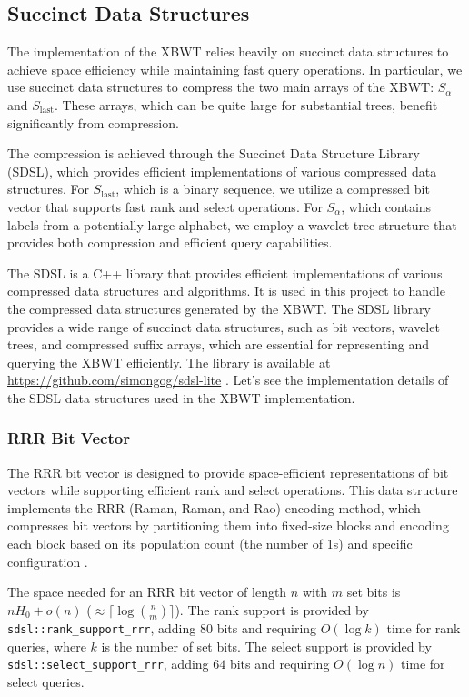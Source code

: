 \subsection{Succinct Data Structures}
The implementation of the XBWT relies heavily on succinct data structures to achieve space efficiency while maintaining fast query operations. In particular, we use succinct data structures to compress the two main arrays of the XBWT: $S_\alpha$ and $S_{\text{last}}$. These arrays, which can be quite large for substantial trees, benefit significantly from compression.

The compression is achieved through the Succinct Data Structure Library (SDSL), which provides efficient implementations of various compressed data structures. For $S_{\text{last}}$, which is a binary sequence, we utilize a compressed bit vector that supports fast rank and select operations. For $S_\alpha$, which contains labels from a potentially large alphabet, we employ a wavelet tree structure that provides both compression and efficient query capabilities.

The SDSL is a C++ library that provides efficient implementations of various compressed data structures and algorithms. It is used in this project to handle the compressed data structures generated by the XBWT. The SDSL library provides a wide range of succinct data structures, such as bit vectors, wavelet trees, and compressed suffix arrays, which are essential for representing and querying the XBWT efficiently. The library is available at \url{https://github.com/simongog/sdsl-lite} \cite{gbmp2014sea}. Let's see the implementation details of the SDSL data structures used in the XBWT implementation.

\subsubsection{RRR Bit Vector}
The RRR bit vector is designed to provide space-efficient representations of bit vectors while supporting efficient rank and select operations. This data structure implements the RRR (Raman, Raman, and Rao) encoding method, which compresses bit vectors by partitioning them into fixed-size blocks and encoding each block based on its population count (the number of 1s) and specific configuration \cite{raman2002succinct}. 

The space needed for an RRR bit vector of length $n$ with $m$ set bits is $nH_0 + o(n)$ ($\approx \lceil \log \binom{n}{m} \rceil$). 
The rank support is provided by \texttt{sdsl::rank\_support\_rrr}, adding $80$ bits and requiring $O(\log k)$ time for rank queries, where $k$ is the number of set bits. The select support is provided by \texttt{sdsl::select\_support\_rrr}, adding $64$ bits and requiring $O(\log n)$ time for select queries.

